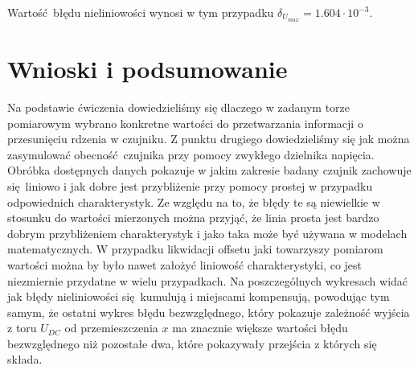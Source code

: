 \documentclass[a4paper, 12pt, titlepage]{article}
\begin{document}
			Wartość błędu nieliniowości wynosi w tym przypadku $\delta_{U_{max}} = 1.604 \cdot 10^{-3}$.
	\section{Wnioski i podsumowanie}
		Na podstawie ćwiczenia dowiedzieliśmy się dlaczego w zadanym torze pomiarowym wybrano konkretne wartości do przetwarzania informacji o przesunięciu rdzenia w czujniku. Z punktu drugiego dowiedzieliśmy się jak można zasymulować obecność czujnika przy pomocy zwykłego dzielnika napięcia.
		\newline \newline
		Obróbka dostępnych danych pokazuje w jakim zakresie badany czujnik zachowuje się liniowo i jak dobre jest przybliżenie przy pomocy prostej w przypadku odpowiednich charakterystyk. Ze względu na to, że błędy te są niewielkie w stosunku do wartości mierzonych można przyjąć, że linia prosta jest bardzo dobrym przybliżeniem charakterystyk i jako taka może być używana w modelach matematycznych.
		\newline \newline
		W przypadku likwidacji offsetu jaki towarzyszy pomiarom wartości można by było nawet założyć liniowość charakterystyki, co jest niezmiernie przydatne w wielu przypadkach.
		\newline \newline 
		Na poszczególnych wykresach widać jak błędy nieliniowości się kumulują i miejscami kompensują, powodując tym samym, że ostatni wykres błędu bezwzględnego, który pokazuje zależność wyjścia z toru $U_{DC}$ od przemieszczenia $x$ ma znacznie większe wartości błędu bezwzględnego niż pozostałe dwa, które pokazywały przejścia z których się składa.
\end{document}
